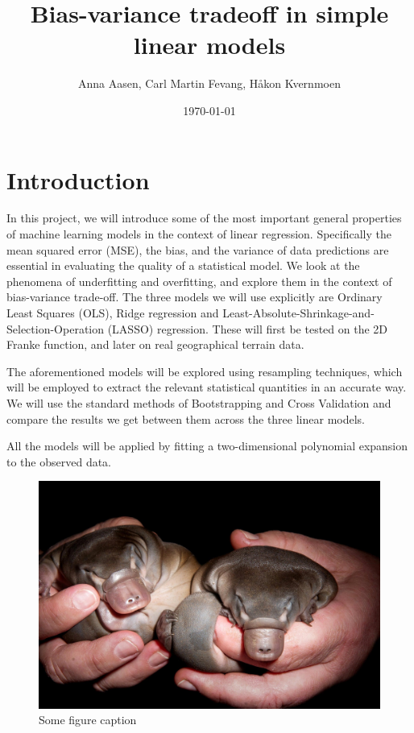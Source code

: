 \documentclass[twocolumn,english,notitlepage]{article}
\title{Bias-variance tradeoff in simple linear models} %
\author{Anna Aasen, Carl Martin Fevang, Håkon Kvernmoen}
\date{\today}
\begin{document}

\section{Introduction}
    In this project, we will introduce some of the most important general properties of machine learning models in the context of linear regression. Specifically the mean squared error (MSE), the bias, and the variance of data predictions are essential in evaluating the quality of a statistical model. We look at the phenomena of underfitting and overfitting, and explore them in the context of bias-variance trade-off. The three models we will use explicitly are Ordinary Least Squares (OLS), Ridge regression and Least-Absolute-Shrinkage-and-Selection-Operation (LASSO) regression. These will first be tested on the 2D Franke function, and later on real geographical terrain data.

    The aforementioned models will be explored using resampling techniques, which will be employed to extract the relevant statistical quantities in an accurate way. We will use the standard methods of Bootstrapping and Cross Validation and compare the results we get between them across the three linear models.

    All the models will be applied by fitting a two-dimensional polynomial expansion to the observed data.



\begin{figure}[H]\label{fig:intro:plat}
    \centering
    \includegraphics[width=0.5\linewidth]{Young-Platypus.jpg}
    \caption{Some figure caption}
\end{figure}
\end{document}
